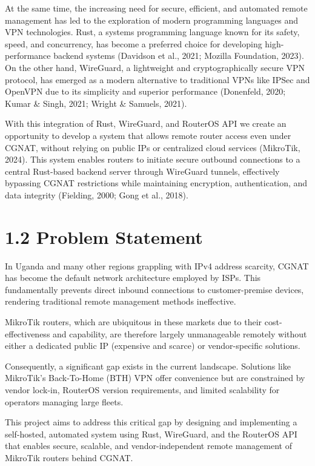 \documentclass[12pt,a4paper,oneside]{report}
\begin{document}
At the same time, the increasing need for secure, efficient, and automated remote management has led to the exploration of modern programming languages and VPN technologies. Rust, a systems programming language known for its safety, speed, and concurrency, has become a preferred choice for developing high-performance backend systems (Davidson et al., 2021; Mozilla Foundation, 2023). On the other hand, WireGuard, a lightweight and cryptographically secure VPN protocol, has emerged as a modern alternative to traditional VPNs like IPSec and OpenVPN due to its simplicity and superior performance (Donenfeld, 2020; Kumar \& Singh, 2021; Wright \& Samuels, 2021).

With this integration of Rust, WireGuard, and RouterOS API we create an opportunity to develop a system that allows remote router access even under CGNAT, without relying on public IPs or centralized cloud services (MikroTik, 2024). This system enables routers to initiate secure outbound connections to a central Rust-based backend server through WireGuard tunnels, effectively bypassing CGNAT restrictions while maintaining encryption, authentication, and data integrity (Fielding, 2000; Gong et al., 2018).

\section{1.2 Problem Statement}

In Uganda and many other regions grappling with IPv4 address scarcity, CGNAT has become the default network architecture employed by ISPs. This fundamentally prevents direct inbound connections to customer-premise devices, rendering traditional remote management methods ineffective.

MikroTik routers, which are ubiquitous in these markets due to their cost-effectiveness and capability, are therefore largely unmanageable remotely without either a dedicated public IP (expensive and scarce) or vendor-specific solutions.

Consequently, a significant gap exists in the current landscape. Solutions like MikroTik's Back-To-Home (BTH) VPN offer convenience but are constrained by vendor lock-in, RouterOS version requirements, and limited scalability for operators managing large fleets.

This project aims to address this critical gap by designing and implementing a self-hosted, automated system using Rust, WireGuard, and the RouterOS API that enables secure, scalable, and vendor-independent remote management of MikroTik routers behind CGNAT.
\end{document}
